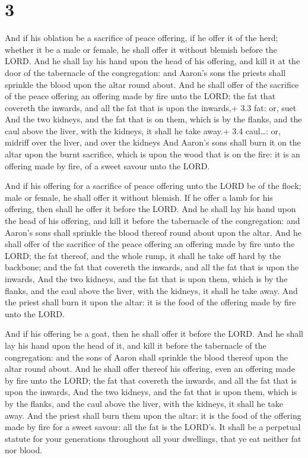 \hypertarget{section-2}{%
\section{3}\label{section-2}}

 And if his oblation be a sacrifice of peace offering, if he
offer it of the herd; whether it be a male or female, he shall offer it
without blemish before the LORD.  And he shall lay his hand
upon the head of his offering, and kill it at the door of the tabernacle
of the congregation: and Aaron's sons the priests shall sprinkle the
blood upon the altar round about.  And he shall offer of the
sacrifice of the peace offering an offering made by fire unto the LORD;
the fat that covereth the inwards, and all the fat that is upon the
inwards,+ 3.3 fat: or, suet  And the two kidneys, and the
fat that is on them, which is by the flanks, and the caul above the
liver, with the kidneys, it shall he take away.+ 3.4 caul\ldots: or,
midriff over the liver, and over the kidneys  And Aaron's
sons shall burn it on the altar upon the burnt sacrifice, which is upon
the wood that is on the fire: it is an offering made by fire, of a sweet
savour unto the LORD.

 And if his offering for a sacrifice of peace offering
unto the LORD be of the flock; male or female, he shall offer it without
blemish.  If he offer a lamb for his offering, then shall he
offer it before the LORD.  And he shall lay his hand upon
the head of his offering, and kill it before the tabernacle of the
congregation: and Aaron's sons shall sprinkle the blood thereof round
about upon the altar.  And he shall offer of the sacrifice
of the peace offering an offering made by fire unto the LORD; the fat
thereof, and the whole rump, it shall he take off hard by the backbone;
and the fat that covereth the inwards, and all the fat that is upon the
inwards,  And the two kidneys, and the fat that is upon
them, which is by the flanks, and the caul above the liver, with the
kidneys, it shall he take away.  And the priest shall burn
it upon the altar: it is the food of the offering made by fire unto the
LORD.

 And if his offering be a goat, then he shall offer it
before the LORD.  And he shall lay his hand upon the head
of it, and kill it before the tabernacle of the congregation: and the
sons of Aaron shall sprinkle the blood thereof upon the altar round
about.  And he shall offer thereof his offering, even an
offering made by fire unto the LORD; the fat that covereth the inwards,
and all the fat that is upon the inwards,  And the two
kidneys, and the fat that is upon them, which is by the flanks, and the
caul above the liver, with the kidneys, it shall he take away.
 And the priest shall burn them upon the altar: it is the
food of the offering made by fire for a sweet savour: all the fat is the
LORD's.  It shall be a perpetual statute for your
generations throughout all your dwellings, that ye eat neither fat nor
blood.

